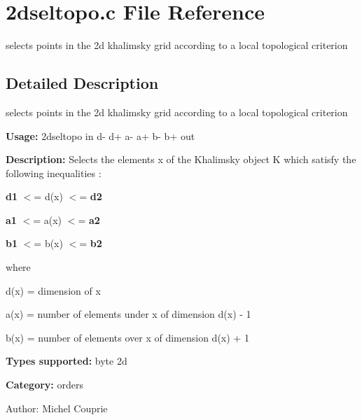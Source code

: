 \section{2dseltopo.c File Reference}
\label{2dseltopo_8c}
selects points in the 2d khalimsky grid according to a local topological criterion  




\label{_details}
\subsection{Detailed Description}
selects points in the 2d khalimsky grid according to a local topological criterion 

{\bf Usage:} 2dseltopo in d- d+ a- a+ b- b+ out

{\bf Description:} Selects the elements x of the Khalimsky object K which satisfy the following inequalities :

{\bf d1} $<$= d(x) $<$= {\bf d2} 

{\bf a1} $<$= a(x) $<$= {\bf a2} 

{\bf b1} $<$= b(x) $<$= {\bf b2} 

where

d(x) = dimension of x

a(x) = number of elements under x of dimension d(x) - 1

b(x) = number of elements over x of dimension d(x) + 1

{\bf Types supported:} byte 2d

{\bf Category:} orders

\begin{Desc}
\item[Author:]Michel Couprie \end{Desc}
